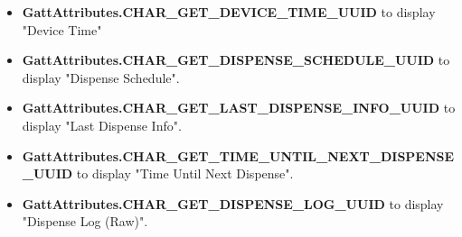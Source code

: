 \begin{itemize}
	\item \textbf{GattAttributes.CHAR\_GET\_DEVICE\_TIME\_UUID} to display "Device Time" 
	\item \textbf{GattAttributes.CHAR\_GET\_DISPENSE\_SCHEDULE\_UUID} to display "Dispense Schedule". 
	\item \textbf{GattAttributes.CHAR\_GET\_LAST\_DISPENSE\_INFO\_UUID} to display "Last Dispense Info". 
	\item \textbf{GattAttributes.CHAR\_GET\_TIME\_UNTIL\_NEXT\_DISPENSE\_UUID} to display "Time Until Next Dispense". 
	\item \textbf{GattAttributes.CHAR\_GET\_DISPENSE\_LOG\_UUID} to display "Dispense Log (Raw)". 
\end{itemize}

